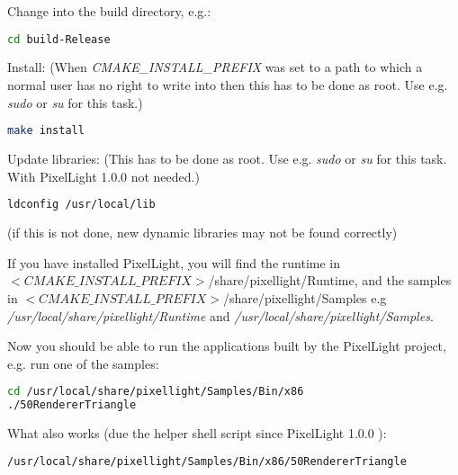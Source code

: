 Change into the build directory, e.g.:
\begin{lstlisting}[language=sh]
cd build-Release
\end{lstlisting}

Install: (When \emph{CMAKE\_INSTALL\_PREFIX} was set to a path to which a normal user has no right to write into then this has to be done as root. Use e.g. \emph{sudo} or \emph{su} for this task.)
\begin{lstlisting}[language=sh]
make install
\end{lstlisting}

Update libraries: (This has to be done as root. Use e.g. \emph{sudo} or \emph{su} for this task. With PixelLight 1.0.0 not needed.)
\begin{lstlisting}[language=sh]
ldconfig /usr/local/lib
\end{lstlisting}
(if this is not done, new dynamic libraries may not be found correctly)

If you have installed PixelLight, you will find the runtime in $<CMAKE\_INSTALL\_PREFIX>$/share/pixellight/Runtime, and the samples in $<CMAKE\_INSTALL\_PREFIX>$/share/pixellight/Samples e.g \emph{/usr/local/share/pixellight/Runtime} and \emph{/usr/local/share/pixellight/Samples}.

Now you should be able to run the applications built by the PixelLight project, e.g. run one of the samples:
\begin{lstlisting}[language=sh]
cd /usr/local/share/pixellight/Samples/Bin/x86
./50RendererTriangle
\end{lstlisting}

What also works (due the helper shell script since PixelLight 1.0.0 ):
\begin{lstlisting}[language=sh]
/usr/local/share/pixellight/Samples/Bin/x86/50RendererTriangle
\end{lstlisting}
